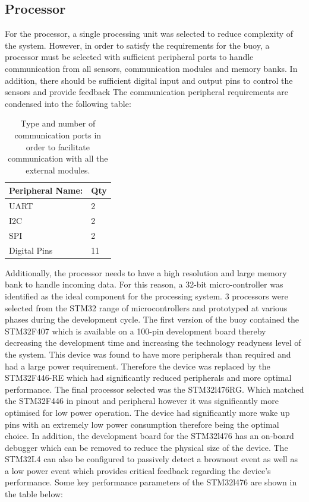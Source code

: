 \subsection{Processor}

For the processor, a single processing unit was selected to reduce complexity of the system. However, in order to satisfy the requirements for the buoy, a processor must be selected with sufficient peripheral ports to handle communication from all sensors, communication modules and memory banks. In addition, there should be sufficient digital input and output pins to control the sensors and provide feedback The communication peripheral requirements are condensed into the following table: 

\begin{table}[H]
	\centering
	\caption{ Type and number of communication ports in order to facilitate communication with  all the external modules.}
	\begin{tabular}{|l|l|}
		\hline \hline
		Peripheral Name: & Qty \\
		\hline \hline
		UART & 2\\
		I2C & 2\\
		SPI & 2\\
		Digital Pins & 11\\
		\hline 
	\end{tabular}
	\label{tab:micro_ports}
\end{table}

Additionally, the processor needs to have a high resolution and large memory bank to handle incoming data. For this reason, a 32-bit micro-controller was identified as the ideal component for the processing system. 3 processors were selected from the STM32 range of microcontrollers and prototyped at various phases during the development cycle. The first version of the buoy contained the STM32F407 which is available on a 100-pin development board thereby decreasing the development time and increasing the technology readyness level of the system. This device was found to have more peripherals than required and had a large power requirement. Therefore the device was replaced by the STM32F446-RE which had significantly reduced peripherals and more optimal performance. The final processor selected was the STM32l476RG. Which matched the STM32F446 in pinout and peripheral however it was significantly more optimised for low power operation. The device had significantly more wake up pins with an extremely low power consumption therefore being the optimal choice. In addition, the development board for the STM32l476 has an on-board debugger which can be removed to reduce the physical size of the device. The STM32L4 can also be configured to passively detect a brownout event as well as a low power event which provides critical feedback regarding the device's performance. Some key performance parameters of the STM32l476 are shown in the table below:

